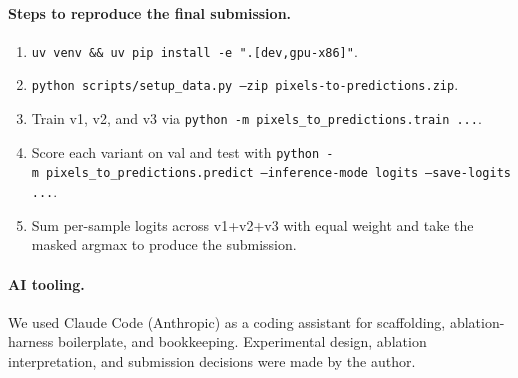 \documentclass[11pt]{article}
\begin{document}
\paragraph{Steps to reproduce the final submission.}

\begin{enumerate}
    \item \texttt{uv venv \&\& uv pip install -e ".[dev,gpu-x86]"}.
    \item \texttt{python scripts/setup\_data.py --zip pixels-to-predictions.zip}.
    \item Train v1, v2, and v3 via \texttt{python -m}\allowbreak\ \texttt{pixels\_to\_predictions.train}\allowbreak\ \texttt{...}.
    \item Score each variant on val and test with \texttt{python -m}\allowbreak\ \texttt{pixels\_to\_predictions.predict}\allowbreak\ \texttt{--inference-mode logits}\allowbreak\ \texttt{--save-logits ...}.
    \item Sum per-sample logits across v1+v2+v3 with equal weight and take the masked argmax to produce the submission.
\end{enumerate}

\paragraph{AI tooling.} We used Claude Code (Anthropic) as a coding assistant for scaffolding, ablation-harness boilerplate, and bookkeeping. Experimental design, ablation interpretation, and submission decisions were made by the author.


\end{document}
